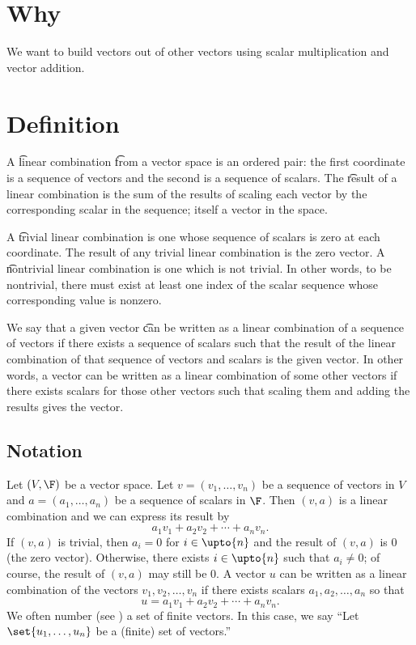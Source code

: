 

\section*{Why}

We want to build vectors out of other vectors using scalar multiplication and vector addition.

\section*{Definition}

A \t{linear combination} \t{from} a vector space is an ordered pair: the first coordinate is a sequence of vectors and the second is a sequence of scalars.
The \t{result} of a linear combination is the sum of the results of scaling each vector by the corresponding scalar in the sequence; itself a vector in the space.

A \t{trivial linear combination} is one whose sequence of scalars is zero at each coordinate.
The result of any trivial linear combination is the zero vector.
A \t{nontrivial linear combination} is one which is not trivial.
In other words, to be nontrivial, there must exist at least one index of the scalar sequence whose corresponding value is nonzero.

We say that a given vector \t{can be written as a linear combination of} a sequence of vectors if there exists a sequence of scalars such that the result of the linear combination of that sequence of vectors and scalars is the given vector.
In other words, a vector can be written as a linear combination of some other vectors if there exists scalars for those other vectors such that scaling them and adding the results gives the vector.

\subsection*{Notation}

Let $(V, \F )$ be a vector space.
Let $v = (v_1, \dots , v_n)$ be a sequence of vectors in $V$ and
$a = (a_1, \dots , a_n)$ be a sequence of scalars in $\F $.
Then $(v, a)$ is a linear combination and we can express its result by
\[
a_1v_1 + a_2v_2 + \cdots + a_n v_n.
\]
If $(v,a)$ is trivial, then $a_i = 0$ for $i \in \upto{n}$ and the result of $(v, a)$ is $0$ (the zero vector).
Otherwise, there exists $i \in \upto{n}$ such that $a_i \neq 0$; of course, the result of $(v, a)$ may still be $0$.
A vector $u$ can be written as a linear combination of the vectors $v_1, v_2, \dots , v_n$ if there exists scalars $a_1, a_2, \dots , a_n$ so that
\[
u = a_1v_1 + a_2v_2 + \cdots + a_nv_n.
\]
We often number (see ) a set of finite vectors.
In this case, we say ``Let $\set{u_1, \dots , u_n}$ be a (finite) set of vectors.''
